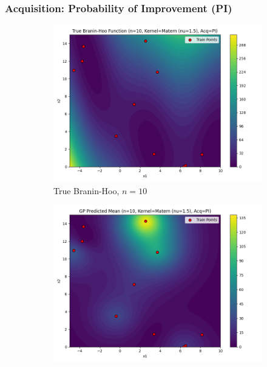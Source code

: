 \documentclass[a4paper,12pt]{article}
\begin{document}
\subsubsection*{Acquisition: Probability of Improvement (PI)}
\begin{figure}[H]
\centering

\begin{subfigure}{0.3\textwidth}
  \includegraphics[width=\linewidth]{Task-02/images/true_function_matern_n10_PI.png}
  \caption{True Branin-Hoo, $n=10$}
\end{subfigure}
\begin{subfigure}{0.3\textwidth}
    \includegraphics[width=\linewidth]{Task-02/images/gp_mean_matern_n10_PI.png}

\end{subfigure}
\end{figure}
\end{document}
